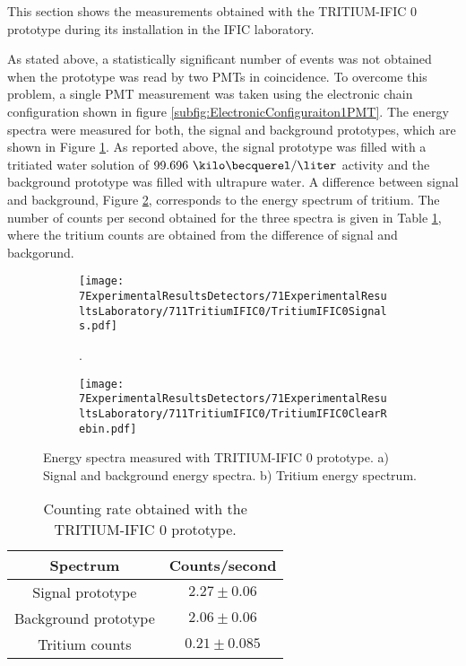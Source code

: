 This section shows the measurements obtained with the TRITIUM-IFIC 0 prototype during its installation in the IFIC laboratory.

As stated above, a statistically significant number of events was not obtained when the prototype was read by two PMTs in coincidence. To overcome this problem, a single PMT measurement was taken using the electronic chain configuration shown in figure \ref{subfig:ElectronicConfiguraiton1PMT}. The energy spectra were measured for both, the signal and background prototypes, which are shown in Figure \ref{subfig:SignalBackgroundEnergySpectraTritiumIFIC0}. As reported above, the signal prototype was filled with a tritiated water solution of $99.696~\kilo\becquerel/\liter$ activity and the background prototype was filled with ultrapure water. A difference between signal and background, Figure \ref{subfig:TritiumEnergySpectraTritiumIFIC0}, corresponds to the energy spectrum of tritium. The number of counts per second obtained for the three spectra is given in Table \ref{tab:CountsPerSecondTRITIUMIFIC0}, where the tritium counts are obtained from the difference of signal and backgorund.


\begin{figure}
\centering
    \begin{subfigure}[b]{1\textwidth}
    \centering
    \texttt{[image: 7ExperimentalResultsDetectors/71ExperimentalResultsLaboratory/711TritiumIFIC0/TritiumIFIC0Signals.pdf]}  
    \caption{.\label{subfig:SignalBackgroundEnergySpectraTritiumIFIC0}}
    \end{subfigure}
    \hfill
    \begin{subfigure}[b]{1\textwidth}
    \centering
    \texttt{[image: 7ExperimentalResultsDetectors/71ExperimentalResultsLaboratory/711TritiumIFIC0/TritiumIFIC0ClearRebin.pdf]}  
    \caption{\label{subfig:TritiumEnergySpectraTritiumIFIC0}}
    \end{subfigure}
 \caption{Energy spectra measured with TRITIUM-IFIC 0 prototype. a) Signal and background energy spectra. b) Tritium energy spectrum.}
 \label{fig:EnergySpectraTRITIUMIFIC0}
\end{figure}

\begin{table}[htbp]
\centering{}%
\begin{tabular}{cc}
\toprule 
Spectrum & Counts/second \tabularnewline
\midrule
\midrule 
Signal prototype & $2.27 \pm 0.06$ \tabularnewline
Background prototype & $2.06 \pm 0.06$ \tabularnewline  
Tritium counts & $0.21 \pm 0.085$ \tabularnewline
\bottomrule
\end{tabular}
\caption{Counting rate obtained with the TRITIUM-IFIC 0 prototype.}
\label{tab:CountsPerSecondTRITIUMIFIC0}
\end{table}

